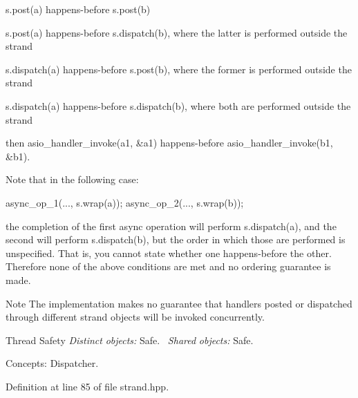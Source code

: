 \begin{DoxyItemize}
\item {\ttfamily s.\+post(a)} happens-\/before {\ttfamily s.\+post(b)} \end{DoxyItemize}
\begin{DoxyItemize}
\item {\ttfamily s.\+post(a)} happens-\/before {\ttfamily s.\+dispatch(b)}, where the latter is performed outside the strand\end{DoxyItemize}
\begin{DoxyItemize}
\item {\ttfamily s.\+dispatch(a)} happens-\/before {\ttfamily s.\+post(b)}, where the former is performed outside the strand\end{DoxyItemize}
\begin{DoxyItemize}
\item {\ttfamily s.\+dispatch(a)} happens-\/before {\ttfamily s.\+dispatch(b)}, where both are performed outside the strand\end{DoxyItemize}
then {\ttfamily asio\+\_\+handler\+\_\+invoke(a1, \&a1)} happens-\/before {\ttfamily asio\+\_\+handler\+\_\+invoke(b1, \&b1)}.

Note that in the following case\+: 
\begin{DoxyCode}
 async\_op\_1(..., s.wrap(a));
async\_op\_2(..., s.wrap(b)); 
\end{DoxyCode}
 the completion of the first async operation will perform {\ttfamily s.\+dispatch(a)}, and the second will perform {\ttfamily s.\+dispatch(b)}, but the order in which those are performed is unspecified. That is, you cannot state whether one happens-\/before the other. Therefore none of the above conditions are met and no ordering guarantee is made.

\begin{DoxyNote}{Note}
The implementation makes no guarantee that handlers posted or dispatched through different {\ttfamily strand} objects will be invoked concurrently.
\end{DoxyNote}
\begin{DoxyParagraph}{Thread Safety}
{\itshape Distinct} {\itshape objects\+:} Safe.~\newline
{\itshape Shared} {\itshape objects\+:} Safe.
\end{DoxyParagraph}
\begin{DoxyParagraph}{Concepts\+:}
Dispatcher. 
\end{DoxyParagraph}


Definition at line 85 of file strand.\+hpp.



